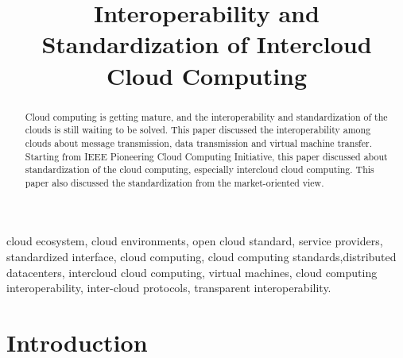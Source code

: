 \documentclass[conference]{IEEEtran}
\begin{document}
\setlength{\parskip}{1em}



\title{Interoperability and Standardization of Intercloud Cloud Computing}

\author{
\and
{}
\and
{}
}

\maketitle



\begin{abstract}
Cloud computing is getting mature, and the interoperability and standardization of the clouds is still waiting to be solved. This paper discussed the interoperability among clouds about message transmission, data transmission and virtual machine transfer. Starting from IEEE Pioneering Cloud Computing Initiative, this paper discussed about standardization of the cloud computing, especially intercloud cloud computing. This paper also discussed the standardization from the market-oriented view.
\end{abstract}


\begin{IEEEkeywords}
cloud ecosystem, cloud environments, open cloud standard, service providers, standardized interface, cloud computing, cloud computing standards,distributed datacenters, intercloud cloud computing, virtual machines, cloud computing interoperability, inter-cloud protocols, transparent interoperability.
\end{IEEEkeywords}

\IEEEpeerreviewmaketitle
\section{Introduction}
\end{document}

